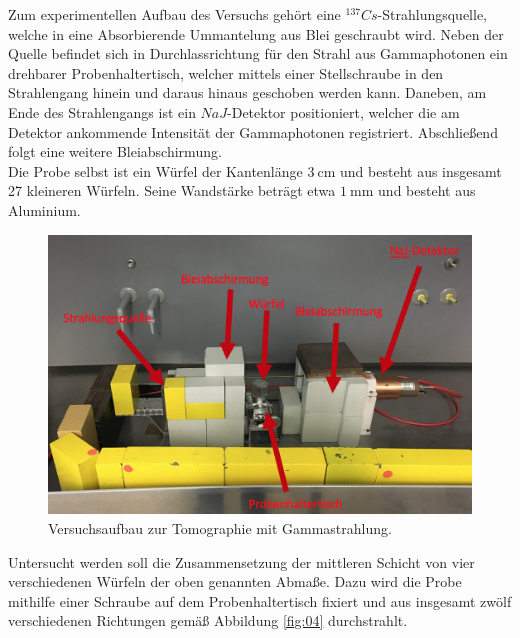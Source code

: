 \noindent Zum experimentellen Aufbau des Versuchs gehört eine
$^{137}Cs$-Strahlungsquelle, welche in eine Absorbierende Ummantelung aus Blei
geschraubt wird. Neben der Quelle befindet sich in Durchlassrichtung für den
Strahl aus Gammaphotonen ein drehbarer Probenhaltertisch, welcher mittels einer
Stellschraube in den Strahlengang hinein und daraus hinaus geschoben werden
kann. Daneben, am Ende des Strahlengangs ist ein $NaJ$-Detektor positioniert,
welcher die am Detektor ankommende Intensität der Gammaphotonen registriert.
Abschließend folgt eine weitere Bleiabschirmung. \\
\noindent Die Probe selbst ist ein Würfel der Kantenlänge $\SI{3}{\centi\meter}$
und besteht aus insgesamt 27 kleineren Würfeln. Seine Wandstärke beträgt etwa
$\SI{1}{\milli\meter}$ und besteht aus Aluminium. \\
\FloatBarrier
\begin{figure}
  \centering
  \includegraphics[scale=0.5]{ressources/aufbau.png}
  \caption{Versuchsaufbau zur Tomographie mit Gammastrahlung.}
  \label{fig:03}
\end{figure}
\FloatBarrier
\noindent Untersucht werden soll die Zusammensetzung der mittleren Schicht von
vier verschiedenen Würfeln der oben genannten Abmaße. Dazu wird die Probe
mithilfe einer Schraube auf dem Probenhaltertisch fixiert und aus insgesamt
zwölf verschiedenen Richtungen gemäß Abbildung \ref{fig:04} durchstrahlt.
\FloatBarrier
